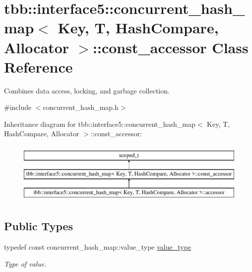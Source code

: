 \hypertarget{classtbb_1_1interface5_1_1concurrent__hash__map_1_1const__accessor}{}\section{tbb\+:\+:interface5\+:\+:concurrent\+\_\+hash\+\_\+map$<$ Key, T, Hash\+Compare, Allocator $>$\+:\+:const\+\_\+accessor Class Reference}
\label{classtbb_1_1interface5_1_1concurrent__hash__map_1_1const__accessor}


Combines data access, locking, and garbage collection.  




{\ttfamily \#include $<$concurrent\+\_\+hash\+\_\+map.\+h$>$}

Inheritance diagram for tbb\+:\+:interface5\+:\+:concurrent\+\_\+hash\+\_\+map$<$ Key, T, Hash\+Compare, Allocator $>$\+:\+:const\+\_\+accessor\+:\begin{figure}[H]
\begin{center}
\leavevmode
\includegraphics[height=3.000000cm]{classtbb_1_1interface5_1_1concurrent__hash__map_1_1const__accessor}
\end{center}
\end{figure}
\subsection*{Public Types}
\begin{DoxyCompactItemize}
\item 
\hypertarget{classtbb_1_1interface5_1_1concurrent__hash__map_1_1const__accessor_a48c2e258079cc9dd190f05fe659918a9}{}typedef const concurrent\+\_\+hash\+\_\+map\+::value\+\_\+type \hyperlink{classtbb_1_1interface5_1_1concurrent__hash__map_1_1const__accessor_a48c2e258079cc9dd190f05fe659918a9}{value\+\_\+type}\label{classtbb_1_1interface5_1_1concurrent__hash__map_1_1const__accessor_a48c2e258079cc9dd190f05fe659918a9}

\begin{DoxyCompactList}\small\item\em Type of value. \end{DoxyCompactList}\end{DoxyCompactItemize}
